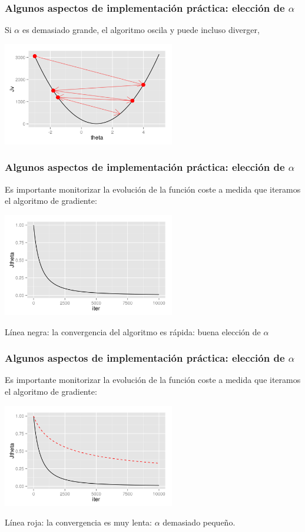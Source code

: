\documentclass[aspectratio=169]{beamer}
\begin{document}
\begin{frame}\frametitle{Algunos aspectos de implementación práctica: elección de $\alpha$}
\begin{overlayarea}{\textwidth}{8cm}
Si $\alpha$ es demasiado grande, el algoritmo oscila y puede incluso diverger,
\begin{center}
\includegraphics[height=4.5cm]{gradientdescent-bigalpha-6.png}
\end{center}
\end{overlayarea}
\end{frame}
\begin{frame}
\frametitle{Algunos aspectos de implementación práctica: elección de $\alpha$}
\begin{overlayarea}{\textwidth}{8cm}
Es importante monitorizar la evolución de la función coste a medida que iteramos el algoritmo de gradiente:
\begin{center}
\includegraphics[height=4.5cm]{Jiter-1.png}
\end{center}
{\scriptsize Línea negra: la convergencia del algoritmo es rápida: buena elección de $\alpha$ }
\end{overlayarea}
\end{frame}

\begin{frame}
\frametitle{Algunos aspectos de implementación práctica: elección de $\alpha$}
\begin{overlayarea}{\textwidth}{8cm}
Es importante monitorizar la evolución de la función coste a medida que iteramos el algoritmo de gradiente:
\begin{center}
\includegraphics[height=4.5cm]{Jiter-2.png}
\end{center}
{\scriptsize Línea roja: la convergencia es muy lenta: $\alpha$ demasiado pequeño.}
\end{overlayarea}
\end{frame}
\end{document}
